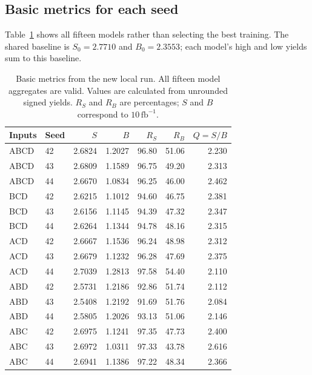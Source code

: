 \documentclass[11pt,a4paper]{article}
\begin{document}
\subsection{Basic metrics for each seed}
Table~\ref{tab:basic-all} shows all fifteen models rather than selecting the best training.
The shared baseline is $S_0=2.7710$ and $B_0=2.3553$; each model's high and low yields sum to this baseline.
\begin{table}[H]
\caption{Basic metrics from the new local run. All fifteen model aggregates are valid. Values are calculated from unrounded signed yields. $R_S$ and $R_B$ are percentages; $S$ and $B$ correspond to $10\,\mathrm{fb}^{-1}$.}
\label{tab:basic-all}
\centering\small
\begin{tabular}{llrrrrr}
\toprule
Inputs & Seed & $S$ & $B$ & $R_S$ & $R_B$ & $Q=S/B$ \\
\midrule
ABCD & 42 & 2.6824 & 1.2027 & 96.80 & 51.06 & 2.230 \\
ABCD & 43 & 2.6809 & 1.1589 & 96.75 & 49.20 & 2.313 \\
ABCD & 44 & 2.6670 & 1.0834 & 96.25 & 46.00 & 2.462 \\
\addlinespace
BCD & 42 & 2.6215 & 1.1012 & 94.60 & 46.75 & 2.381 \\
BCD & 43 & 2.6156 & 1.1145 & 94.39 & 47.32 & 2.347 \\
BCD & 44 & 2.6264 & 1.1344 & 94.78 & 48.16 & 2.315 \\
\addlinespace
ACD & 42 & 2.6667 & 1.1536 & 96.24 & 48.98 & 2.312 \\
ACD & 43 & 2.6679 & 1.1232 & 96.28 & 47.69 & 2.375 \\
ACD & 44 & 2.7039 & 1.2813 & 97.58 & 54.40 & 2.110 \\
\addlinespace
ABD & 42 & 2.5731 & 1.2186 & 92.86 & 51.74 & 2.112 \\
ABD & 43 & 2.5408 & 1.2192 & 91.69 & 51.76 & 2.084 \\
ABD & 44 & 2.5805 & 1.2026 & 93.13 & 51.06 & 2.146 \\
\addlinespace
ABC & 42 & 2.6975 & 1.1241 & 97.35 & 47.73 & 2.400 \\
ABC & 43 & 2.6972 & 1.0311 & 97.33 & 43.78 & 2.616 \\
ABC & 44 & 2.6941 & 1.1386 & 97.22 & 48.34 & 2.366 \\
\bottomrule
\end{tabular}
\end{table}

\end{document}
